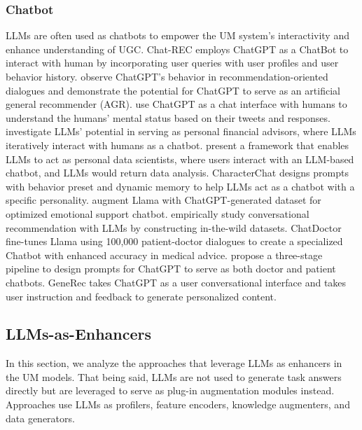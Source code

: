 \documentclass[11pt]{article}
\newcommand{\edit}[1]{\textcolor{blue}{#1}}
\newcommand{\comments}[1]{\textcolor{red}{[Re:~#1]}}
\begin{document}
\subsubsection{Chatbot}
LLMs are often used as chatbots to empower the UM system's interactivity and enhance understanding of UGC.
Chat-REC \cite{gao2023chat} employs ChatGPT as a ChatBot to interact with human by incorporating user queries with user profiles and user behavior history. \citet{lin2023sparks} observe ChatGPT's behavior in recommendation-oriented dialogues and demonstrate the potential for ChatGPT to serve as an artificial general recommender (AGR). \cite{qin2023read} use ChatGPT as a chat interface with humans to understand the humans' mental status based on their tweets and responses. \citet{lakkaraju2023can} investigate LLMs' potential in serving as personal financial advisors, where LLMs iteratively interact with humans as a chatbot. \citet{hassan2023chatgpt} present a framework that enables LLMs to act as personal data scientists, where users interact with an LLM-based chatbot, and LLMs would return data analysis. CharacterChat \cite{tu2023characterchat} designs prompts with behavior preset and dynamic memory to help LLMs act as a chatbot with a specific personality. \citet{zheng2023building} augment Llama with ChatGPT-generated dataset for optimized emotional support chatbot. \citet{he2023large} empirically study conversational recommendation with LLMs by constructing in-the-wild datasets. ChatDoctor \cite{li2023chatdoctor} fine-tunes Llama using 100,000 patient-doctor dialogues to create a specialized Chatbot with enhanced accuracy in medical advice. \citet{chen2023llm} propose a three-stage pipeline to design prompts for ChatGPT to serve as both doctor and patient chatbots. GeneRec \cite{wang2023generative} takes ChatGPT as a user conversational interface and takes user instruction and feedback to generate personalized content.



\subsection{LLMs-as-Enhancers}
In this section, we analyze the approaches that leverage LLMs as enhancers in the UM models. That being said, LLMs are not used to generate task answers directly but are leveraged to serve as plug-in augmentation modules instead. Approaches use LLMs as profilers, feature encoders, knowledge augmenters, and data generators.
\end{document}
